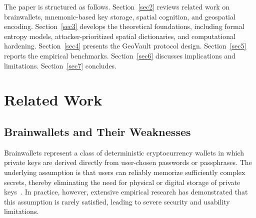 \documentclass[mathematics,article,accept,pdftex,moreauthors]{Definitions/mdpi}
\begin{document}
{The paper is structured as follows. Section~\ref{sec2} reviews related work on brainwallets, mnemonic-based key storage, spatial cognition, and geospatial encoding. Section~\ref{sec3} develops the theoretical foundations, including formal entropy models, attacker-prioritized spatial dictionaries, and computational hardening. Section~\ref{sec4} presents the GeoVault protocol design. Section~\ref{sec5} reports the empirical benchmarks. Section~\ref{sec6} discusses implications and limitations. Section~\ref{sec7} concludes.}

\section{Related Work\label{sec2}}

\subsection{Brainwallets and Their Weaknesses\label{sec2.1}}

Brainwallets represent a class of deterministic cryptocurrency wallets in which private keys are derived directly from user-chosen passwords or passphrases. The underlying assumption is that users can reliably memorize sufficiently complex secrets, thereby eliminating the need for physical or digital storage of private keys~\cite{Das2019, Vasek2017}. In practice, however, extensive empirical research has demonstrated that this assumption is rarely satisfied, leading to severe security and usability limitations.
\end{document}
